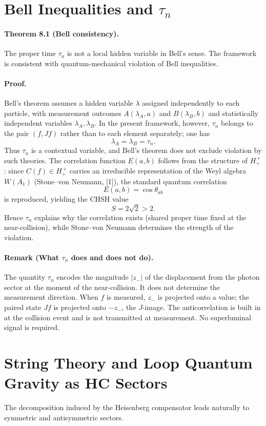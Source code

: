 \documentclass[12pt,a4paper]{article}
\begin{document}
\section{Bell Inequalities and \texorpdfstring{$\tau_n$}{tau_n}}
\paragraph*{Theorem 8.1 (Bell consistency).}
The proper time $\tau_n$ is not a local hidden variable in Bell's sense. The framework is consistent with quantum-mechanical violation of Bell inequalities.

\paragraph*{Proof.}
Bell's theorem assumes a hidden variable $\lambda$ assigned independently to each particle, with measurement outcomes $A(\lambda_A,a)$ and $B(\lambda_B,b)$ and statistically independent variables $\lambda_A,\lambda_B$. In the present framework, however, $\tau_n$ belongs to the pair $(f,Jf)$ rather than to each element separately; one has
\[
\lambda_A = \lambda_B = \tau_n.
\]
Thus $\tau_n$ is a contextual variable, and Bell's theorem does not exclude violation by such theories. The correlation function $E(a,b)$ follows from the structure of $H_+^{\,+}$: since $C(f) \in H_+^{\,+}$ carries an irreducible representation of the Weyl algebra $W(A_1)$ (Stone--von Neumann, [1]), the standard quantum correlation
\[
E(a,b)=\cos \theta_{ab}
\]
is reproduced, yielding the CHSH value
\[
S = 2\sqrt{2} > 2.
\]
Hence $\tau_n$ explains why the correlation exists (shared proper time fixed at the near-collision), while Stone--von Neumann determines the strength of the violation.

\paragraph*{Remark (What $\tau_n$ does and does not do).}
The quantity $\tau_n$ encodes the magnitude $|z_-|$ of the displacement from the photon sector at the moment of the near-collision. It does not determine the measurement direction. When $f$ is measured, $z_-$ is projected onto a value; the paired state $Jf$ is projected onto $-z_-$, the $J$-image. The anticorrelation is built in at the collision event and is not transmitted at measurement. No superluminal signal is required.

\section{String Theory and Loop Quantum Gravity as HC Sectors}
The decomposition induced by the Heisenberg compensator leads naturally to symmetric and antisymmetric sectors.
\end{document}
